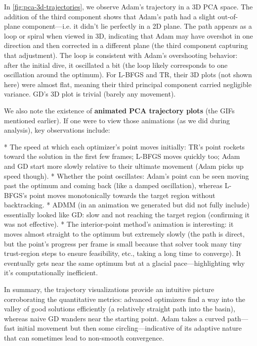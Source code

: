 \documentclass[12pt]{article}
\begin{document}
In \cref{fig:pca-3d-trajectories}, we observe Adam’s trajectory in a 3D PCA space. The addition of the third component shows that Adam’s path had a slight out-of-plane component—i.e. it didn’t lie perfectly in a 2D plane. The path appears as a loop or spiral when viewed in 3D, indicating that Adam may have overshot in one direction and then corrected in a different plane (the third component capturing that adjustment). The loop is consistent with Adam’s overshooting behavior: after the initial dive, it oscillated a bit (the loop likely corresponds to one oscillation around the optimum). For L-BFGS and TR, their 3D plots (not shown here) were almost flat, meaning their third principal component carried negligible variance. GD’s 3D plot is trivial (barely any movement).

We also note the existence of \textbf{animated PCA trajectory plots} (the GIFs mentioned earlier). If one were to view those animations (as we did during analysis), key observations include:

* The speed at which each optimizer’s point moves initially: TR’s point rockets toward the solution in the first few frames; L-BFGS moves quickly too; Adam and GD start more slowly relative to their ultimate movement (Adam picks up speed though).
* Whether the point oscillates: Adam’s point can be seen moving past the optimum and coming back (like a damped oscillation), whereas L-BFGS’s point moves monotonically towards the target region without backtracking.
* ADMM (in an animation we generated but did not fully include) essentially looked like GD: slow and not reaching the target region (confirming it was not effective).
* The interior-point method’s animation is interesting: it moves almost straight to the optimum but extremely slowly (the path is direct, but the point’s progress per frame is small because that solver took many tiny trust-region steps to ensure feasibility, etc., taking a long time to converge). It eventually gets near the same optimum but at a glacial pace—highlighting why it’s computationally inefficient.

In summary, the trajectory visualizations provide an intuitive picture corroborating the quantitative metrics: advanced optimizers find a way into the valley of good solutions efficiently (a relatively straight path into the basin), whereas naive GD wanders near the starting point. Adam takes a curved path—fast initial movement but then some circling—indicative of its adaptive nature that can sometimes lead to non-smooth convergence.
\end{document}
